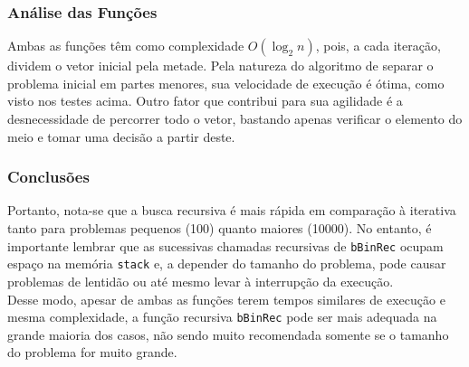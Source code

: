 \subsubsection{Análise das Funções}
Ambas as funções têm como complexidade $O(\log_2 n)$, pois, a cada iteração, dividem o vetor inicial pela metade. Pela natureza do algoritmo de separar o problema inicial em partes menores, sua velocidade de execução é ótima, como visto nos testes acima. Outro fator que contribui para sua agilidade é a desnecessidade de percorrer todo o vetor, bastando apenas verificar o elemento do meio e tomar uma decisão a partir deste.

\subsubsection{Conclusões}

Portanto, nota-se que a busca recursiva é mais rápida em comparação à iterativa tanto para problemas pequenos (100) quanto maiores (10000). No entanto, é importante lembrar que as sucessivas chamadas recursivas de \texttt{bBinRec} ocupam espaço na memória \texttt{stack} e, a depender do tamanho do problema, pode causar problemas de lentidão ou até mesmo levar à interrupção da execução. \\

Desse modo, apesar de ambas as funções terem tempos similares de execução e mesma complexidade, a função recursiva \texttt{bBinRec} pode ser mais adequada na grande maioria dos casos, não sendo muito recomendada somente se o tamanho do problema for muito grande.

